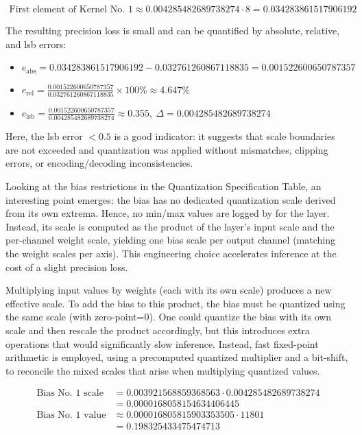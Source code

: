 {\[
\begin{array}{rl}
\text{First element of Kernel No. 1} \approx 0.004285482689738274 \cdot 8 = 0.034283861517906192
\end{array}
\]

The resulting precision loss is small and can be quantified by absolute, relative, and \gls{lsb} errors:

\begin{itemize}[itemsep=0.4\baselineskip]
    \item $e_{\text{abs}} = 0.034283861517906192 - 0.032761260867118835 = 0.001522600650787357$
    \item $e_{\text{rel}} = \frac{0.001522600650787357}{0.032761260867118835} \times 100\% \approx 4.647\%$
    \item $e_{\text{lsb}} = \frac{0.001522600650787357}{0.004285482689738274} \approx 0.355,\ \Delta = 0.004285482689738274$
\end{itemize}

Here, the \gls{lsb} error $<0.5$ is a good indicator: it suggests that scale boundaries are not exceeded and quantization was applied without mismatches,
clipping errors, or encoding/decoding inconsistencies.

Looking at the bias restrictions in the Quantization Specification Table, an interesting point emerges:
the bias has no dedicated quantization scale derived from its own extrema.
Hence, no min/max values are logged by  for the  layer.
Instead, its scale is computed as the product of the layer's input scale and the per-channel weight scale,
yielding one bias scale per output channel (matching the weight scales per axis).
This engineering choice accelerates inference at the cost of a slight precision loss.

Multiplying input values by weights (each with its own scale) produces a new effective scale.
To add the bias to this product, the bias must be quantized using the same scale (with zero-point=0).
One could quantize the bias with its own scale and then rescale the product accordingly,
but this introduces extra operations that would significantly slow inference.
Instead, fast fixed-point arithmetic is employed, using a precomputed quantized multiplier and a bit-shift,
to reconcile the mixed scales that arise when multiplying quantized values.

\[
\begin{array}{rl}
\text{Bias No. 1 scale} &= 0.003921568859368563 \cdot 0.004285482689738274 \\
             &= 0.0000168058154634406445 \\[8pt]
\text{Bias No. 1 value} &\approx 0.000016805815903353505 \cdot 11801 \\
      &= 0.198325433475474713
\end{array}
\]

}
